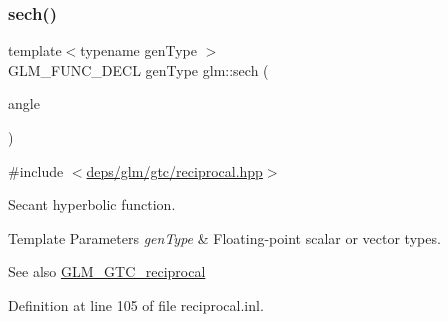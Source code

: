 \subsubsection{\texorpdfstring{sech()}{sech()}}
{\footnotesize\ttfamily template$<$typename gen\+Type $>$ \\
G\+L\+M\+\_\+\+F\+U\+N\+C\+\_\+\+D\+E\+CL gen\+Type glm\+::sech (\begin{DoxyParamCaption}\item[{gen\+Type}]{angle }\end{DoxyParamCaption})}



{\ttfamily \#include $<$\hyperlink{reciprocal_8hpp}{deps/glm/gtc/reciprocal.\+hpp}$>$}

Secant hyperbolic function.


\begin{DoxyTemplParams}{Template Parameters}
{\em gen\+Type} & Floating-\/point scalar or vector types.\\
\hline
\end{DoxyTemplParams}
\begin{DoxySeeAlso}{See also}
\hyperlink{group__gtc__reciprocal}{G\+L\+M\+\_\+\+G\+T\+C\+\_\+reciprocal} 
\end{DoxySeeAlso}


Definition at line 105 of file reciprocal.\+inl.

